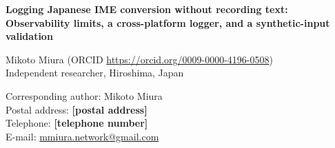 \documentclass[12pt]{article}
\begin{document}
\begin{center}
{\large\bfseries Logging Japanese IME conversion without recording text: Observability limits, a cross-platform
logger, and a synthetic-input validation\par}
\end{center}

\bigskip

\noindent Mikoto Miura (ORCID \url{https://orcid.org/0009-0000-4196-0508})\\
Independent researcher, Hiroshima, Japan

\bigskip

\noindent Corresponding author: Mikoto Miura\\
Postal address: \textbf{[postal address]}\\
Telephone: \textbf{[telephone number]}\\
E-mail: \href{mailto:mmiura.network@gmail.com}{mmiura.network@gmail.com}
\end{document}
